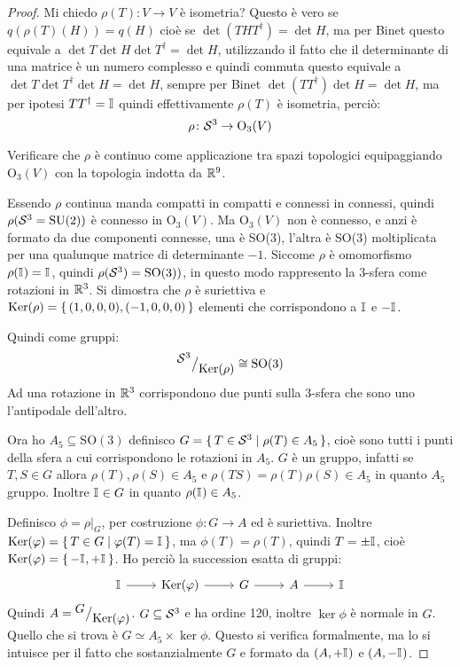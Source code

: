 \begin{proof}
  Mi chiedo $ \rho(T) \colon V \to V $ è isometria? Questo è vero se $ q(\rho(T)(H)) = q(H) $
  cioè se $ \det(THT^\dagger) = \det{H} $, ma per Binet questo equivale a
  $ \det{T}\det{H}\det{T^\dagger} = \det{H} $, utilizzando il fatto che il determinante
  di una matrice è un numero complesso e quindi commuta questo equivale a
  $ \det{T}\det{T^\dagger}\det{H} = \det{H} $, sempre per Binet  $ \det(TT^\dagger)\det{H} = \det{H} $,
  ma per ipotesi $ TT^\dagger = \mathbb{I}_{} $ quindi effettivamente $ \rho(T) $ è isometria, perciò:
  \[
    \rho \colon \mathcal{S}^{3} \to \mathrm{O}_3(V)
  \]
  \begin{exercise}
    Verificare che $ \rho $ è continuo come applicazione tra spazi topologici
    equipaggiando $ \mathrm{O}_3(V) $ con la topologia indotta da $ \mathbb{R}^{9} $.
  \end{exercise}
  Essendo $ \rho $ continua manda compatti in compatti e connessi in connessi, quindi
  $ \rho(\mathcal{S}^{3}= \mathrm{SU(2)}) $ è connesso in $ \mathrm{O}_3(V) $.
  Ma $ \mathrm{O}_3(V) $ non è connesso, e anzi è formato da due componenti connesse,
  una è SO(3), l'altra è SO(3) moltiplicata per una qualunque matrice di determinante
  $ - 1 $. Siccome $ \rho $ è omomorfismo $ \rho(\mathbb{I}_{}) = \mathbb{I}_{} $, quindi $ \rho(\mathcal{S}^{3}) =  \mathrm{SO(3)}) $,
  in questo modo rappresento la $ 3 $-sfera come rotazioni in $ \mathbb{R}^{3} $.
  Si dimostra che $ \rho $ è suriettiva e $ \mathrm{Ker}( \rho) = \set{(1,0,0,0), (-1,0,0,0)} $ elementi
  che corrispondono a $ \mathbb{I}_{} $ e $ -\mathbb{I}_{} $.

  Quindi come gruppi:
  \[
    {^{\textstyle \mathcal{S}^{3}}\big/_{\textstyle \mathrm{Ker}( \rho)}} \cong \mathrm{SO(3)}
  \]
  Ad una rotazione in $ \mathbb{R}^{3} $ corrispondono due punti sulla $ 3 $-sfera che sono
  uno l'antipodale dell'altro.

  Ora ho $ A_5 \subseteq \mathrm{SO(3)} $ definisco $ G = \set{ T \in \mathcal{S}^{3} | \rho(T) \in A_5} $,
  cioè sono tutti i punti della sfera a cui corrispondono le rotazioni in $ A_5 $.
  $ G $ è un gruppo, infatti se $ T, S \in G $ allora $ \rho(T), \rho(S) \in A_5 $ e
  $ \rho(TS) = \rho(T)\rho(S) \in A_5 $ in quanto $ A_5 $ gruppo. Inoltre $ \mathbb{I}_{} \in G $ in quanto
  $ \rho(\mathbb{I}_{}) \in A_5 $.

  Definisco $ \phi = \rho \big \lvert_G $, per costruzione $ \phi \colon G \to A $ ed è suriettiva.
  Inoltre $ \mathrm{Ker}( \varphi) = \set{ T \in G | \varphi(T) = \mathbb{I}_{}} $, ma $ \phi(T) = \rho(T) $, quindi
  $ T = \pm \mathbb{I}_{} $, cioè $ \mathrm{Ker}( \varphi) = \set{- \mathbb{I}_{}, + \mathbb{I}_{}} $. Ho perciò la succession
  esatta di gruppi:
  \[
    \begin{tikzcd}
      \Id{} \arrow{r}{} & \ker{\phi} \arrow{r}{} & G \arrow{r}{} & A \arrow{r}{} & \Id{}
    \end{tikzcd}
  \]
  Quindi $ A = {^{\textstyle G}\big/_{\textstyle \mathrm{Ker}( \varphi)}} $.
  $ G \subseteq \mathcal{S}^{3} $ e ha ordine 120, inoltre $ \ker{\phi} $ è normale in $ G $.
  Quello che si trova è $ G \simeq A_5 \times \ker{\phi} $. Questo si verifica formalmente, ma lo si
  intuisce per il fatto che sostanzialmente $ G $ e formato da $ (A, + \mathbb{I}_{}) $ e  $ (A, - \mathbb{I}_{}) $.


\end{proof}

